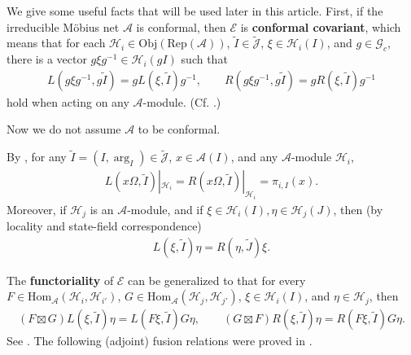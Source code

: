 \documentclass[11pt,b5paper,notitlepage]{article}
\theoremstyle{definition}
\theoremstyle{plain}
\newcommand{\mc}{\mathcal}
\newcommand{\wtd}{\widetilde}
\newcommand{\Hom}{\mathrm{Hom}}
\newcommand{\scr}{\mathscr}
\newcommand{\Jtd}{\widetilde{\mathcal J}}
\newcommand{\RepA}{\mathrm{Rep}(\mathcal A)}
\newcommand{\Gc}{\mathscr G_c}
\newcommand{\Obj}{\mathrm{Obj}}
\numberwithin{equation}{section}
\begin{document}
We give some useful facts that will be used later in this article. First, if the irreducible M\"obius net $\mc A$ is conformal, then $\scr E$ is \textbf{conformal covariant}, which means that for each $\mc H_i\in\Obj(\RepA)$, $\wtd I\in\Jtd$, $\xi\in\mc H_i(I)$, and $g\in\Gc$, there is a vector $g\xi g^{-1}\in\mc H_i(gI)$ such that
\begin{align}
L(g\xi g^{-1},g\wtd I)=gL(\xi,\wtd I)g^{-1},\qquad R(g\xi g^{-1},g\wtd I)=gR(\xi,\wtd I)g^{-1}\label{eq17}
\end{align}
hold when acting on any $\mc A$-module. (Cf. \cite[Thm. 3.13]{Gui21a}.) 



Now we do not assume $\mc A$ to be conformal.  

By \cite[Rem. 2.2]{Gui21b}, for any $\wtd I=(I,\arg_I)\in\Jtd$, $x\in\mc A(I)$, and any $\mc A$-module $\mc H_i$,
\begin{align}
L(x\Omega,\wtd I)|_{\mc H_i}=R(x\Omega,\wtd I)|_{\mc H_i}=\pi_{i,I}(x).	\label{eq5}
\end{align}
Moreover, if $\mc H_j$ is an $\mc A$-module, and if $\xi\in\mc H_i(I),\eta\in\mc H_j(J)$, then (by locality and state-field correspondence)
\begin{align}
	L(\xi,\wtd I)\eta=R(\eta,\wtd J)\xi.\label{eq25}
\end{align}

The \textbf{functoriality} of $\scr E$ can be generalized to that for every $F\in\Hom_{\mc A}(\mc H_i,\mc H_{i'})$, $G\in\Hom_{\mc A}(\mc H_j,\mc H_{j'})$,  $\xi\in\mc H_i(I)$, and $\eta\in\mc H_j$, then
\begin{align}
	(F\boxtimes G)L(\xi,\wtd I)\eta=L(F\xi,\wtd I)G\eta,\qquad (G\boxtimes F)R(\xi,\wtd I)\eta=R(F\xi,\wtd I)G\eta.\label{eq2}
\end{align}
See \cite[Sec. 2]{Gui21b}. The following (adjoint) fusion relations were  proved in \cite[Prop. 2.3]{Gui21b}.
\end{document}
